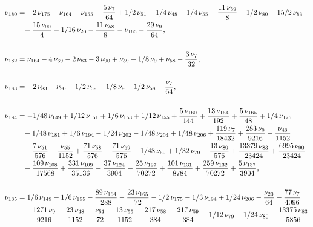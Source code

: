 \documentclass[a4paper,12pt, DIV=14, BCOR=5mm, twoside, headsepline, numbers=noenddot]{scrbook}
\begin{document}
\begin{align}\label{AreaSol16}
\begin{aligned}
\nu_{{180}}&=-2\,\nu_{{175}}-\nu_{{164}}-\nu_{{155}}-{\frac {5\,\nu_{{7}}}{
64}}+1/2\,\nu_{{51}}+1/4\,\nu_{{48}}+1/4\,\nu_{{55}}-{\frac {11\,\nu_{
{59}}}{8}}-1/2\,\nu_{{80}}-15/2\,\nu_{{83}}\\
 &\hphantom{=}-{\frac {15\,\nu_{{90}}}{4}
}-1/16\,\nu_{{20}}-{\frac {11\,\nu_{{58}}}{8}}-\nu_{{165}}-{\frac {29
\,\nu_{{9}}}{64}},\\
\\
\nu_{{182}}&=\nu_{{164}}-4\,\nu_{{69}}-2\,\nu_{{83}}-
3\,\nu_{{90}}+\nu_{{59}}-1/8\,\nu_{{9}}+\nu_{{58}}-{\frac {3\,\nu_{{7}
}}{32}}, \\
\\
\nu_{{183}}&=-2\,\nu_{{83}}-\nu_{{90}}-1/2\,\nu_{{59}}-1/8\,\nu
_{{9}}-1/2\,\nu_{{58}}-{\frac {\nu_{{7}}}{64}}, \\
\\
\nu_{{184}}&=-1/48\,\nu_
{{149}}+1/12\,\nu_{{151}}+1/6\,\nu_{{153}}+1/12\,\nu_{{155}}+{\frac {5
\,\nu_{{160}}}{144}}+{\frac {13\,\nu_{{164}}}{192}}+{\frac {5\,\nu_{{
165}}}{48}}+1/4\,\nu_{{175}}\\
 &\hphantom{=}-1/48\,\nu_{{181}}+1/6\,\nu_{{194}}-1/24\,
\nu_{{202}}-1/48\,\nu_{{204}}+1/48\,\nu_{{206}}+{\frac {119\,\nu_{{7}}
}{18432}}+{\frac {283\,\nu_{{9}}}{9216}}-{\frac {\nu_{{48}}}{1152}}\\
 &\hphantom{=}-{
\frac {7\,\nu_{{51}}}{576}}-{\frac {\nu_{{55}}}{1152}}+{\frac {71\,\nu
_{{58}}}{576}}+{\frac {71\,\nu_{{59}}}{576}}+1/48\,\nu_{{69}}+1/32\,
\nu_{{79}}+{\frac {13\,\nu_{{80}}}{576}}+{\frac {13379\,\nu_{{83}}}{
23424}}+{\frac {6995\,\nu_{{90}}}{23424}}\\
 &\hphantom{=}-{\frac {109\,\nu_{{108}}}{
17568}}+{\frac {331\,\nu_{{109}}}{35136}}-{\frac {37\,\nu_{{124}}}{
3904}}-{\frac {25\,\nu_{{127}}}{70272}}+{\frac {101\,\nu_{{131}}}{8784
}}+{\frac {259\,\nu_{{132}}}{70272}}+{\frac {5\,\nu_{{137}}}{3904}},\\
\\
\nu_{{185}}&=1/6\,\nu_{{149}}-1/6\,\nu_{{155}}-{\frac {89\,\nu_{{164}}
}{288}}-{\frac {23\,\nu_{{165}}}{72}}-1/2\,\nu_{{175}}-1/3\,\nu_{{194}
}+1/24\,\nu_{{206}}-{\frac {\nu_{{20}}}{64}}-{\frac {77\,\nu_{{7}}}{
4096}}\\
 &\hphantom{=}-{\frac {1271\,\nu_{{9}}}{9216}}-{\frac {23\,\nu_{{48}}}{1152}}+
{\frac {\nu_{{51}}}{72}}-{\frac {13\,\nu_{{55}}}{1152}}-{\frac {217\,
\nu_{{58}}}{384}}-{\frac {217\,\nu_{{59}}}{384}}-1/12\,\nu_{{79}}-1/24
\,\nu_{{80}}-{\frac {13375\,\nu_{{83}}}{5856}}\\

\end{aligned}
\end{align}
\end{document}
